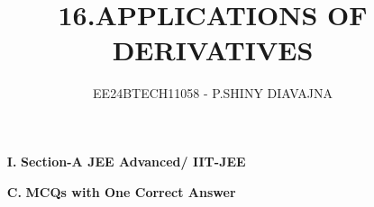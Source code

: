 \documentclass[journal,12pt,twocolumn]{IEEEtran}
\theoremstyle{remark}
\begin{document}

\vspace{3cm}

\title{16.APPLICATIONS OF DERIVATIVES}
\author{EE24BTECH11058 - P.SHINY DIAVAJNA}

\maketitle
\newpage
\bigskip


\renewcommand{\thefigure}{\theenumi}
\renewcommand{\thetable}{\theenumi}

 \begin{enumerate}
  \item[\textbf{I.} ]\textbf{Section-A JEE Advanced/ IIT-JEE}\\
 \end{enumerate} 
   \begin{enumerate}
  \item[\textbf{C.}] \textbf{MCQs with One Correct Answer}\\
   \end{enumerate}
\end{document}

